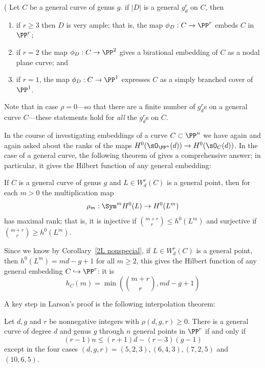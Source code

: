 \begin{theorem}\label{grd omnibus}(\cite[Proposition 5.4]{Eisenbud-Harris83}
Let $C$ be a general curve of genus $g$.
 if $|D|$ is a general $g^r_d$ on $C$, then

 \begin{enumerate}
\item if $r \geq 3$ then $D$ is very ample; that is, the map $\phi_D : C \to \PP^r$   embeds $C$ in $\PP^r$;
\item if $r=2$ the map $\phi_D : C \to \PP^2$ gives a birational embedding of $C$ as a nodal plane curve; and 
\item if $r=1$, the map $\phi_D : C \to \PP^1$ expresses $C$ as a simply branched cover of $\PP^1$.
\end{enumerate}
\end{theorem}

Note that in case $\rho = 0$---so that there are a finite number of $g^r_d$s on a general curve $C$---these statements hold for \emph{all} the $g^r_d$s on $C$.

In the course of investigating embeddings of a curve $C\subset \PP^n$ we have again and again
asked about the ranks of the maps $H^0(\sO_{\PP^n}(d)) \to H^0(\sO_C(d))$. In the case of
a general curve, the following theorem of \cite{ELarson2018} gives a comprehensive answer; in particular, it gives
 the Hilbert function of any general embedding:
 
\begin{theorem}[Larson]\label{maximal rank}
If $C$ is a general curve of genus $g$ and $L \in W^r_d(C)$ is a general point, then for each $m > 0$ the multiplication map
$$
\rho_m : \Sym^m H^0(L) \to H^0(L^m)
$$
has maximal rank; that is, it is injective if $\binom{m+r}{r} \leq h^0(L^m)$ and surjective if $\binom{m+r}{r} \geq h^0(L^m)$.
\end{theorem}



Since we know by Corollary~\ref{2L nonspecial}, if $L \in W^r_d(C)$ is a general point, then $h^0(L^m) = md-g+1$ for all $m \geq 2$, this gives
 the Hilbert function of any general embedding $C \hookrightarrow \PP^r$: it is 
 $$
 h_C(m) = \min(\binom{m+r}{r} , md-g+1)
 $$
 


A key step in Larson's proof is the following interpolation theorem:

\begin{theorem}\label{Larson-Vogt}
Let $d, g$ and $r$
be nonnegative integers with $\rho(d, g, r) \geq 0$. There is a general curve of degree $d$ and genus $g$ through $n$ general
points in $\PP^r$
if and only if
$$
(r-1)n \leq (r + 1)d-(r-3)(g-1)
$$
except in the four cases $(d, g, r) = (5, 2, 3),(6, 4, 3),(7, 2, 5)$ and $(10, 6, 5)$.

 \end{theorem}
 
